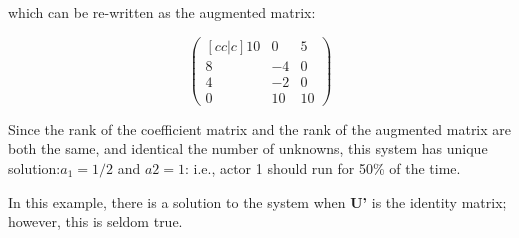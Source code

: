 which can be re-written as the augmented matrix:

\begin{equation}
\begin{pmatrix}[cc|c]
  10 & 0 & 5   \\
  8 & -4 & 0  \\
  4 & -2 &  0 \\
  0 & 10 & 10  
 \end{pmatrix}
\end{equation}


Since the rank of the coefficient matrix and the rank of the augmented matrix are both the same, and identical the number of unknowns, this system has unique solution:$a_1=1/2$ and $a2=1$: i.e., actor 1 should run for 50\% of the time. 
\par In this example, there is a solution to the system when \textbf{U'} is the identity matrix; however, this is seldom true. 




